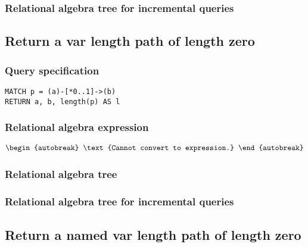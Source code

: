 \subsubsection*{Relational algebra tree for incremental queries}


\subsection{Return a var length path of length zero}

\subsubsection*{Query specification}

\begin{lstlisting}
MATCH p = (a)-[*0..1]->(b)
RETURN a, b, length(p) AS l
\end{lstlisting}

\subsubsection*{Relational algebra expression}

\begin{align*}
\begin{autobreak}
\text{Cannot convert to expression.}
\end{autobreak}
\end{align*}

\subsubsection*{Relational algebra tree}


\subsubsection*{Relational algebra tree for incremental queries}


\subsection{Return a named var length path of length zero}


